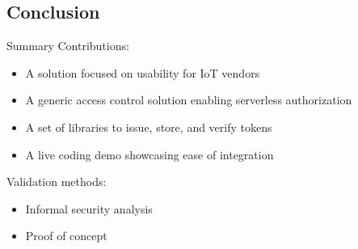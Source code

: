\subsection{Conclusion}

\begin{frame}{Summary}
Contributions:
    \begin{itemize}
        \item A solution focused on usability for IoT vendors
        \item A generic access control solution enabling serverless authorization
        \item A set of libraries to issue, store, and verify tokens
        \item A live coding demo showcasing ease of integration
    \end{itemize}

\bigskip

Validation methods:
    \begin{itemize}
        \item Informal security analysis
        \item Proof of concept
    \end{itemize}
    
\end{frame}

